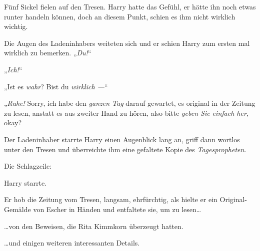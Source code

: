 Fünf Sickel fielen auf den Tresen. Harry hatte das Gefühl, er hätte ihn noch etwas runter handeln können, doch an diesem Punkt, schien es ihm nicht wirklich wichtig.

Die Augen des Ladeninhabers weiteten sich und er schien Harry zum ersten mal wirklich zu bemerken. „\emph{Du!}“

„\emph{Ich!}“

„Ist es \emph{wahr}? Bist du \emph{wirklich —}“

„\emph{Ruhe!} Sorry, ich habe den \emph{ganzen Tag} darauf gewartet, es original in der Zeitung zu lesen, anstatt es aus zweiter Hand zu hören, also bitte \emph{geben Sie einfach her,} okay?

Der Ladeninhaber starrte Harry einen Augenblick lang an, griff dann wortlos unter den Tresen und überreichte ihm eine gefaltete Kopie des \emph{Tagespropheten}.

Die Schlagzeile:


Harry starrte.

Er hob die Zeitung vom Tresen, langsam, ehrfürchtig, als hielte er ein Original-Gemälde von Escher in Händen und entfaltete sie, um zu lesen…

…von den Beweisen, die Rita Kimmkorn überzeugt hatten.

…und einigen weiteren interessanten Details.

